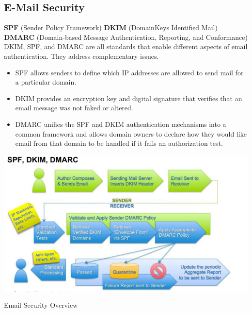 \subsection{E-Mail Security}

\textbf{SPF} (Sender Policy Framework)
\textbf{DKIM} (DomainKeys Identified Mail)
\textbf{DMARC} (Domain-based Message Authentication, Reporting, and Conformance)
DKIM, SPF, and DMARC are all standards that enable different aspects of email authentication. They address complementary issues.
\begin{itemize}
  \item SPF allows senders to define which IP addresses are allowed to send mail for a particular domain.
  \item DKIM provides an encryption key and digital signature that verifies that an email message was not faked or altered.
  \item DMARC unifies the SPF and DKIM authentication mechanisms into a common framework and allows domain owners to declare how they would like email from that domain to be handled if it fails an authorization test.
\end{itemize}

\begin{table}[h]
  \centering
  \includegraphics[width=\textwidth]{resources/12-e-mail-security-overview.png}
  \caption{Email Security Overview}
\end{table}

